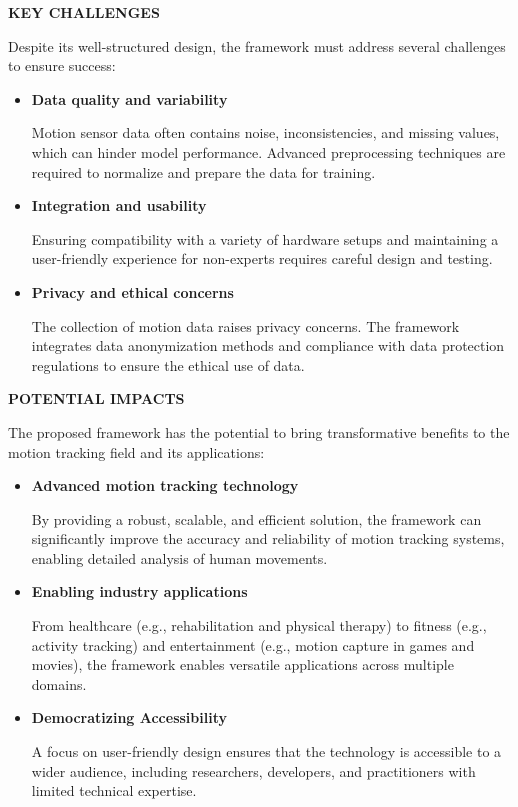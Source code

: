\textbf{KEY CHALLENGES}

Despite its well-structured design, the framework must address several challenges to ensure success:
\begin{itemize}
    \item \textbf{Data quality and variability}
    
    Motion sensor data often contains noise, inconsistencies, and missing values, which can hinder model performance. Advanced preprocessing techniques are required to normalize and prepare the data for training.

    \item \textbf{Integration and usability}
    
    Ensuring compatibility with a variety of hardware setups and maintaining a user-friendly experience for non-experts requires careful design and testing.

    \item \textbf{Privacy and ethical concerns}
    
    The collection of motion data raises privacy concerns. The framework integrates data anonymization methods and compliance with data protection regulations to ensure the ethical use of data.
\end{itemize}


\textbf{POTENTIAL IMPACTS}

The proposed framework has the potential to bring transformative benefits to the motion tracking field and its applications:

\begin{itemize}
    \item \textbf{Advanced motion tracking technology}
    
    By providing a robust, scalable, and efficient solution, the framework can significantly improve the accuracy and reliability of motion tracking systems, enabling detailed analysis of human movements.

    \item \textbf{Enabling industry applications}

    From healthcare (e.g., rehabilitation and physical therapy) to fitness (e.g., activity tracking) and entertainment (e.g., motion capture in games and movies), the framework enables versatile applications across multiple domains.

    \item \textbf{Democratizing Accessibility}
    
    A focus on user-friendly design ensures that the technology is accessible to a wider audience, including researchers, developers, and practitioners with limited technical expertise.
\end{itemize}


